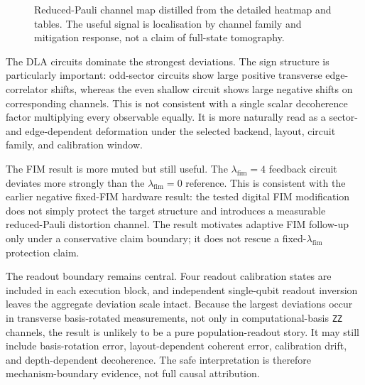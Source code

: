 \documentclass[preprint,aps,physrev,superscriptaddress,floatfix,longbibliography]{revtex4-2}
\begin{document}
\begin{figure}[tb]
\centering
{}
\caption{Reduced-Pauli channel map distilled from the detailed heatmap and
tables. The useful signal is localisation by channel family and mitigation
response, not a claim of full-state tomography.}
\label{fig:channel-map}
\end{figure}

The DLA circuits dominate the strongest deviations. The sign structure is
particularly important: odd-sector circuits show large positive transverse
edge-correlator shifts, whereas the even shallow circuit shows large negative
shifts on corresponding channels. This is not consistent with a single scalar
decoherence factor multiplying every observable equally. It is more naturally
read as a sector- and edge-dependent deformation under the selected backend,
layout, circuit family, and calibration window.

The FIM result is more muted but still useful. The $\lambda_{\mathrm{fim}}=4$
feedback circuit deviates more strongly than the $\lambda_{\mathrm{fim}}=0$
reference. This is consistent with the earlier negative fixed-FIM hardware
result: the tested digital FIM modification does not simply protect the target
structure and introduces a measurable reduced-Pauli distortion channel. The
result motivates adaptive FIM follow-up only under a conservative claim
boundary; it does not rescue a fixed-$\lambda_{\mathrm{fim}}$ protection claim.

The readout boundary remains central. Four readout calibration states are
included in each execution block, and independent single-qubit readout
inversion leaves the aggregate deviation scale intact. Because the largest
deviations occur in transverse basis-rotated measurements, not only in
computational-basis \texttt{ZZ} channels, the result is unlikely to be a pure
population-readout story. It may still include basis-rotation error,
layout-dependent coherent error, calibration drift, and depth-dependent
decoherence. The safe interpretation is therefore mechanism-boundary evidence,
not full causal attribution.
\end{document}
